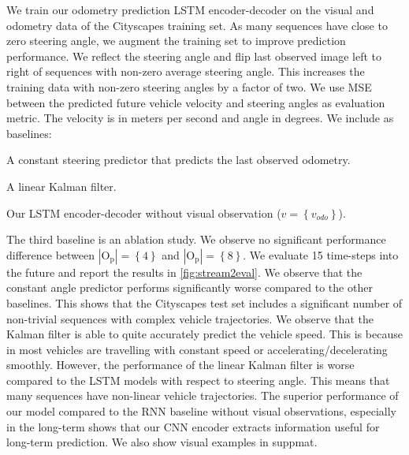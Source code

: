  We train our odometry prediction LSTM encoder-decoder on the visual and odometry data of the Cityscapes training set. As many sequences have close to zero steering angle, we augment the training set to improve prediction performance. We reflect the steering angle and flip last observed image left to right of sequences with non-zero average steering angle. This increases the training data with non-zero steering angles by a factor of two.  We use MSE between the predicted future vehicle velocity and steering angles as evaluation metric. The velocity is in meters per second and angle in degrees. We include as baselines:
\begin{enumerate*}
    \item A constant steering predictor that predicts the last observed odometry.
    \item A linear Kalman filter.
    \item Our LSTM encoder-decoder without visual observation ($v = \left\{ v_{odo}\right\}$).
\end{enumerate*}
The third baseline is an ablation study. We observe no significant performance difference between $| \text{O}_{\text{p}}| = \left\{4\right\}$ and $| \text{O}_{\text{p}}| = \left\{8\right\}$. We evaluate 15 time-steps into the future and report the results in \autoref{fig:stream2eval}. We observe that the constant angle predictor performs significantly worse compared to the other baselines. This shows that the Cityscapes test set includes a significant number of non-trivial sequences with complex vehicle trajectories. We observe that the Kalman filter is able to quite accurately predict the vehicle speed. This is because in most vehicles are travelling with constant speed or accelerating/decelerating smoothly. However, the performance of the linear Kalman filter is worse compared to the LSTM models with respect to steering angle. This means that many sequences have non-linear vehicle trajectories. The superior performance of our model compared to the RNN baseline without visual observations, especially in the long-term shows that our CNN encoder extracts information useful for long-term prediction. We also show visual examples in suppmat.

